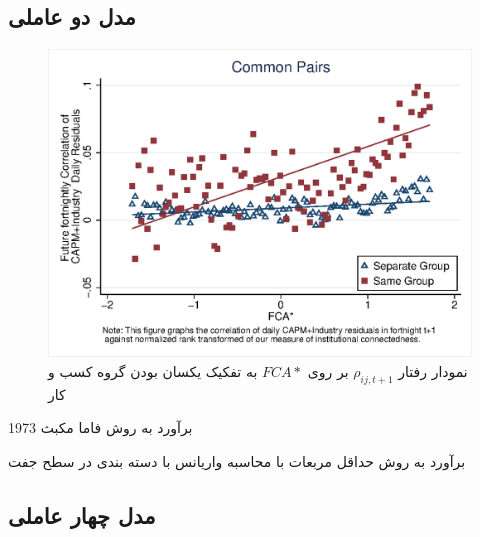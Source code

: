 \documentclass[12pt]{article}
\begin{document}
\begin{appendices}
\subsection{مدل دو عاملی}
  
  \begin{figure}[htbp]
   \centering
   \includegraphics[width=.7\linewidth]{wcorr2g.eps}
     \caption{نمودار رفتار  
         $ \rho_{ij,{t+1}} $
           بر روی 
     $ FCA* $ 
     به تفکیک یکسان بودن گروه کسب و کار}
     \label{f1}
   \end{figure}



\begin{table}[htbp]
\centering
\begin{LTR}
\lr{
   \resizebox{\textwidth}{!}{
   
   }
   }
\end{LTR}
\caption{برآورد به روش فاما مکبث 1973}
\label{t14}
\end{table}

 \begin{table}[htbp]
 \centering
 \begin{LTR}
 \lr{
    \resizebox{\textwidth}{!}{
    
    }
    }
 \end{LTR}
 \caption{برآورد به روش حداقل مربعات با محاسبه واریانس با دسته بندی در سطح جفت}
 \label{t17}
 \end{table}
\FloatBarrier

\subsection{مدل چهار عاملی}


\end{appendices}
\end{document}
